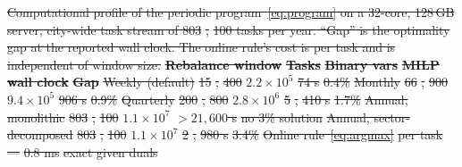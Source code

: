 \documentclass[utf8]{FrontiersinHarvard}
\providecommand{\DIFdel}[1]{{\protect\color{red}\sout{#1}}}                      %
\providecommand{\DIFdelFL}[1]{\DIFdel{#1}} %
\begin{document}
{%
\DIFdelFL{Computational profile of the periodic program~\eqref{eq:program} on a 32-core, 128\,GB server, city-wide task stream of 803}%
\DIFdelFL{,}%
\DIFdelFL{100 tasks per year. ``Gap'' is the optimality gap at the reported wall clock. The online rule's cost is per task and is independent of window size.}}
\textbf{\DIFdelFL{Rebalance window}} %
\textbf{\DIFdelFL{Tasks}} %
\textbf{\DIFdelFL{Binary vars}} %
\textbf{\DIFdelFL{MILP wall clock}} %
\textbf{\DIFdelFL{Gap}}%
\DIFdelFL{Weekly (default) }%
\DIFdelFL{15}%
\DIFdelFL{,}%
\DIFdelFL{400 }%
\DIFdelFL{$2.2\times10^{5}$ }%
\DIFdelFL{74 s }%
\DIFdelFL{0.4\%}%
\DIFdelFL{Monthly }%
\DIFdelFL{66}%
\DIFdelFL{,}%
\DIFdelFL{900 }%
\DIFdelFL{$9.4\times10^{5}$ }%
\DIFdelFL{906 s }%
\DIFdelFL{0.9\%}%
\DIFdelFL{Quarterly }%
\DIFdelFL{200}%
\DIFdelFL{,}%
\DIFdelFL{800 }%
\DIFdelFL{$2.8\times10^{6}$ }%
\DIFdelFL{5}%
\DIFdelFL{,}%
\DIFdelFL{410 s }%
\DIFdelFL{1.7\%}%
\DIFdelFL{Annual, monolithic }%
\DIFdelFL{803}%
\DIFdelFL{,}%
\DIFdelFL{100 }%
\DIFdelFL{$1.1\times10^{7}$ }%
\DIFdelFL{$>21{,}600$ s }%
\DIFdelFL{no 3\% solution}%
\DIFdelFL{Annual, sector-decomposed }%
\DIFdelFL{803}%
\DIFdelFL{,}%
\DIFdelFL{100 }%
\DIFdelFL{$1.1\times10^{7}$ }%
\DIFdelFL{2}%
\DIFdelFL{,}%
\DIFdelFL{980 s }%
\DIFdelFL{3.4\%}%
\DIFdelFL{Online rule~\eqref{eq:argmax} }%
\DIFdelFL{per task }%
\DIFdelFL{--- }%
\DIFdelFL{0.8 ms }%
\DIFdelFL{exact given duals}%
\end{document}
